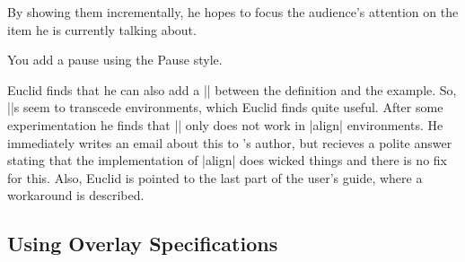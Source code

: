 By showing them incrementally, he
hopes to focus the audience's attention on the item he is currently
talking about.

\lyxnote
You add a pause using the Pause style.

Euclid finds that he can also add a |\pause| between the definition
and the example. So, |\pause|s seem to transcede environments, which
Euclid finds quite useful. After some experimentation he finds that
|\pause| only does not work in |align| environments. He immediately
writes an email about this to \beamer's author, but recieves a polite
answer stating that the implementation of |align| does wicked things
and there is no fix for this. Also, Euclid is pointed to the last part
of the user's guide, where a workaround is described. 


\subsection{Using Overlay Specifications}

